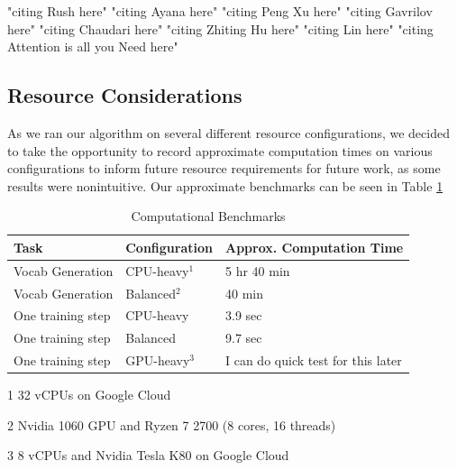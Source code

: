 \documentclass[11pt]{article}
\begin{document}
"citing Rush here" \citep{rush2015neural}
"citing Ayana here" \cite{Ayana2017}
"citing Peng Xu here" \cite{DBLP:journals/corr/abs-1902-07110}
"citing Gavrilov here" \cite{DBLP:journals/corr/abs-1901-07786}
"citing Chaudari here" \cite{DBLP:journals/corr/abs-1802-09426}
"citing Zhiting Hu here" \cite{DBLP:journals/corr/HuYLSX17}
"citing Lin here" \cite{lin-2004-rouge}
"citing Attention is all you Need here" \cite{DBLP:journals/corr/VaswaniSPUJGKP17}




\begin{appendices}

\section{Resource Considerations}

As we ran our algorithm on several different resource configurations, we decided to take the opportunity to record approximate computation times on various configurations to inform future resource requirements for future work, as some results were nonintuitive. Our approximate benchmarks can be seen in Table \ref{table:hardware}

\begin{table}[h!]
\begin{threeparttable}
\centering
\begin{small}
\begin{tabular}{|p{2cm}|p{2.2cm}|p{2cm}|} 
 \hline
 Task & Configuration & Approx. Computation Time \\ [0.5ex] 
 \hline\hline
 Vocab Generation & CPU-heavy$^{1}$ & 5 hr 40 min \\ 
 Vocab Generation & Balanced$^{2}$ & 40 min \\
 \hline
 One training step & CPU-heavy & 3.9 sec \\
 One training step & Balanced & 9.7 sec \\ 
 One training step & GPU-heavy$^{3}$ & I can do quick test for this later \\[1ex]
 \hline
\end{tabular}
\end{small}
\begin{tablenotes}\footnotesize
\item[1] 32 vCPUs on Google Cloud
\item[2] Nvidia 1060 GPU and Ryzen 7 2700 (8 cores, 16 threads)
\item[3] 8 vCPUs and Nvidia Tesla K80 on Google Cloud
\end{tablenotes}
\caption{Computational Benchmarks}
\end{threeparttable}
\label{table:hardware}
\end{table}


\end{appendices}
\end{document}
